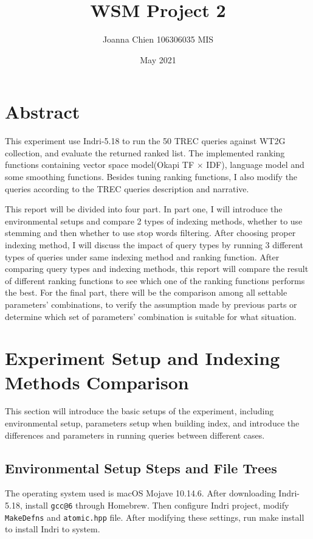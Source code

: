 \documentclass[10pt, a4paper]{article}
\title{WSM Project 2}
\author{Joanna Chien 106306035 MIS}
\date{May 2021}
\begin{document}
\maketitle

\section{Abstract}
This experiment use Indri-5.18 to run the 50 TREC queries against WT2G collection, and evaluate the returned ranked list. The implemented ranking functions containing vector space model(Okapi TF $\times$ IDF), language model and some smoothing functions. Besides tuning ranking functions, I also modify the queries according to the TREC queries description and narrative.

This report will be divided into four part. In part one, I will introduce the environmental setups and compare 2 types of indexing methods, whether to use stemming and then whether to use stop words filtering. After choosing proper indexing method, I will discuss the impact of query types by running 3 different types of queries under same indexing method and ranking function. After comparing query types and indexing methods, this report will compare the result of different ranking functions to see which one of the ranking functions performs the best. For the final part, there will be the comparison among all settable parameters' combinations, to verify the assumption made by previous parts or determine which set of parameters' combination is suitable for what situation.

\section{Experiment Setup and Indexing Methods Comparison}
\label{section:2}
This section will introduce the basic setups of the experiment, including environmental setup, parameters setup when building index, and introduce the differences and parameters in running queries between different cases.

\subsection{Environmental Setup Steps and File Trees}
The operating system used is macOS Mojave 10.14.6. After downloading Indri-5.18, install \verb|gcc@6| through Homebrew. Then configure Indri project, modify \verb|MakeDefns| and \verb|atomic.hpp| file. After modifying these settings, run make install to install Indri to system.
\end{document}
